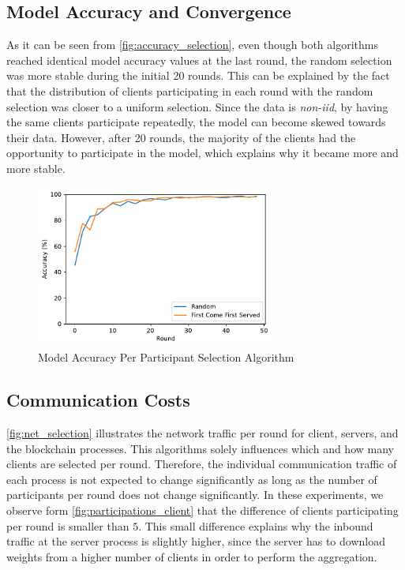 \subsection{Model Accuracy and Convergence}

As it can be seen from \autoref{fig:accuracy_selection}, even though both algorithms reached identical model accuracy values at the last round, the random selection was more stable during the initial 20 rounds. This can be explained by the fact that the distribution of clients participating in each round with the random selection was closer to a uniform selection. Since the data is \textit{non-iid}, by having the same clients participate repeatedly, the model can become skewed towards their data. However, after 20 rounds, the majority of the clients had the opportunity to participate in the model, which explains why it became more and more stable.

\begin{figure}[!ht]
    \centering
    \centering
    \includegraphics[width=0.7\textwidth]{graphics/selection/accuracy.pdf}
    \caption{Model Accuracy Per Participant Selection Algorithm}
    \label{fig:accuracy_selection}
\end{figure}

\subsection{Communication Costs}

\autoref{fig:net_selection} illustrates the network traffic per round for client, servers, and the blockchain processes. This algorithms solely influences which and how many clients are selected per round. Therefore, the individual communication traffic of each process is not expected to change significantly as long as the number of participants per round does not change significantly. In these experiments, we observe form \autoref{fig:participations_client} that the difference of clients participating per round is smaller than $5$. This small difference explains why the inbound traffic at the server process is slightly higher, since the server has to download weights from a higher number of clients in order to perform the aggregation.

